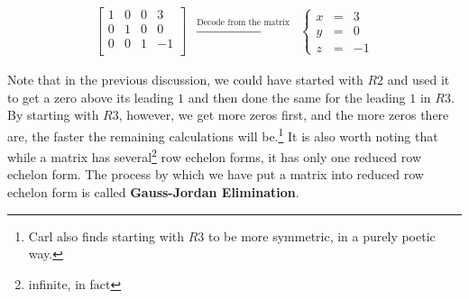 \[ \begin{array}{ccc}

\left[ \begin{array}{rrr|r} 
1 & 0 & 0 & 3 \\ 
0 & 1 & 0 & 0 \\ 
0 & 0 &1 & -1 \\ 
\end{array} \right]  
 
& 
\xrightarrow{\text{Decode from the matrix}} 
& 
\left\{ \begin{array}{rcr} 
x & = & 3 \\ 
y & = & 0 \\ 
z & = & -1 \end{array} \right.

\end{array}\]

Note that in the previous discussion, we could have started with $R2$ and used it to get a zero above its leading $1$ and then done the same for the leading $1$ in $R3$.  By starting with $R3$, however, we get more zeros first, and the more zeros there are, the faster the remaining calculations will be.\footnote{Carl also finds starting with $R3$ to be more symmetric, in a purely poetic way.}  It is also worth noting that while a matrix has several\footnote{infinite, in fact} row echelon forms, it has only one reduced row echelon form.  The process by which we have put a matrix into reduced row echelon form is called   \textbf{Gauss-Jordan Elimination}.

